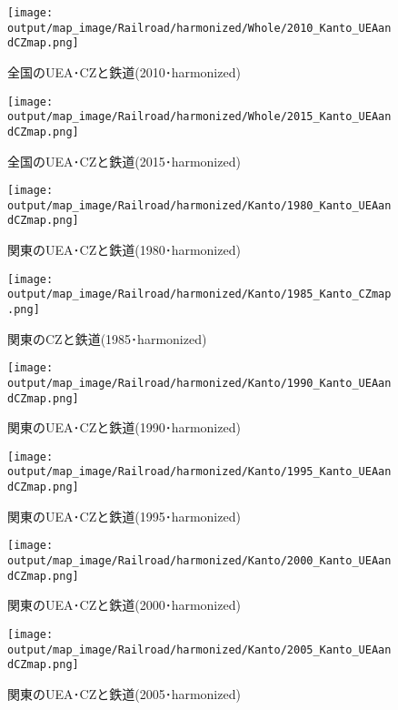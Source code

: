 \documentclass{ltjsarticle}
\begin{document}
\begin{figure}[pbth]
  \centering
  \texttt{[image: output/map\_image/Railroad/harmonized/Whole/2010\_Kanto\_UEAandCZmap.png]}
  \caption{\label{ham:2010:allCZandUEA:Rail}全国のUEA･CZと鉄道(2010･harmonized)}
\end{figure}


\begin{figure}[pbth]
  \centering
  \texttt{[image: output/map\_image/Railroad/harmonized/Whole/2015\_Kanto\_UEAandCZmap.png]}
  \caption{\label{ham:2015:allCZandUEA:Rail}全国のUEA･CZと鉄道(2015･harmonized)}
\end{figure}

\begin{figure}[pbth]
  \centering
  \texttt{[image: output/map\_image/Railroad/harmonized/Kanto/1980\_Kanto\_UEAandCZmap.png]}
  \caption{\label{ham:1980:KanCZandUEA:Rail}関東のUEA･CZと鉄道(1980･harmonized)}
\end{figure}


\begin{figure}[pbth]
  \centering
  \texttt{[image: output/map\_image/Railroad/harmonized/Kanto/1985\_Kanto\_CZmap.png]}
  \caption{\label{ham:1985:KanCZandUEA:Rail}関東のCZと鉄道(1985･harmonized)}
\end{figure}


\begin{figure}[pbth]
  \centering
  \texttt{[image: output/map\_image/Railroad/harmonized/Kanto/1990\_Kanto\_UEAandCZmap.png]}
  \caption{\label{ham:1990:KanCZandUEA:Rail}関東のUEA･CZと鉄道(1990･harmonized)}
\end{figure}


\begin{figure}[pbth]
  \centering
  \texttt{[image: output/map\_image/Railroad/harmonized/Kanto/1995\_Kanto\_UEAandCZmap.png]}
  \caption{\label{ham:1995:KanCZandUEA:Rail}関東のUEA･CZと鉄道(1995･harmonized)}
\end{figure}


\begin{figure}[pbth]
  \centering
  \texttt{[image: output/map\_image/Railroad/harmonized/Kanto/2000\_Kanto\_UEAandCZmap.png]}
  \caption{\label{ham:2000:KanCZandUEA:Rail}関東のUEA･CZと鉄道(2000･harmonized)}
\end{figure}


\begin{figure}[pbth]
  \centering
  \texttt{[image: output/map\_image/Railroad/harmonized/Kanto/2005\_Kanto\_UEAandCZmap.png]}
  \caption{\label{ham:2005:KanCZandUEA:Rail}関東のUEA･CZと鉄道(2005･harmonized)}
\end{figure}
\end{document}
